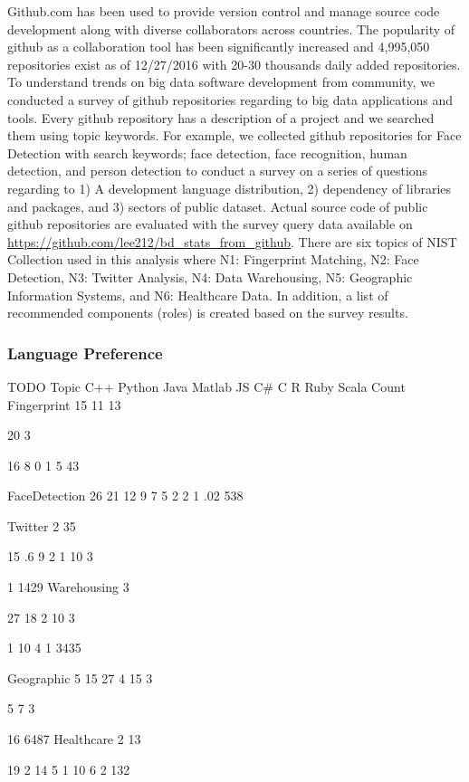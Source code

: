 \documentclass[9pt,twocolumn,twoside]{styles/osajnl}
\begin{document}
Github.com has been used to provide version control and manage source
code development along with diverse collaborators across
countries. The popularity of github as a collaboration tool has been
significantly increased and 4,995,050 repositories exist as of
12/27/2016 with 20-30 thousands daily added repositories. To
understand trends on big data software development from community, we
conducted a survey of github repositories regarding to big data
applications and tools. Every github repository has a description of a
project and we searched them using topic keywords. For example, we
collected github repositories for Face Detection with search keywords;
face detection, face recognition, human detection, and person
detection to conduct a survey on a series of questions regarding to 1)
A development language distribution, 2) dependency of libraries and
packages, and 3) sectors of public dataset. Actual source code of
public github repositories are evaluated with the survey query data
available on
\url{https://github.com/lee212/bd_stats_from_github}. There are six
topics of NIST Collection used in this analysis where N1: Fingerprint
Matching, N2: Face Detection, N3: Twitter Analysis, N4: Data
Warehousing, N5: Geographic Information Systems, and N6: Healthcare
Data. In addition, a list of recommended components (roles) is created
based on the survey results.

\subsubsection{Language Preference}

TODO
Topic
	C++
	Python
	Java
	Matlab
	JS
	C\#
	C
	R
	Ruby
	Scala
	Count
	Fingerprint
	15%
	11%
	13%

	20%
	3%

	16%
	8%
	0%
	1%
	5%
	43

	FaceDetection
	26%
	21%
	12%
	9%
	7%
	5%
	2%
	2%
	1%
	.02%
	538

	Twitter
	2%
	35%

	15%
	.6%
	9%
	2%
	1%
	10%
	3%

	1%
	1429
	Warehousing
	3%

	27%
	18%
	2%
	10%
	3%

	1%
	10%
	4%
	1%
	3435

	Geographic
	5%
	15%
	27%
	4%
	15%
	3%

	5%
	7%
	3%

	16%
	6487
	Healthcare
	2%
	13%

	19%
	2%
	14%
	5%
	1%
	10%
	6%
	2%
	132
\end{document}

